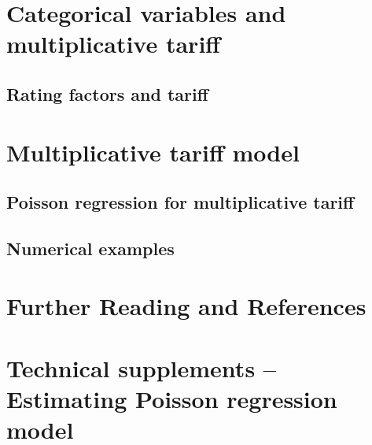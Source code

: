 \documentclass[]{book}
\theoremstyle{definition}
\theoremstyle{definition}
\theoremstyle{definition}
\theoremstyle{remark}
\begin{document}
\section{Categorical variables and multiplicative
tariff}\label{categorical-variables-and-multiplicative-tariff}

\subsection{Rating factors and tariff}\label{rating-factors-and-tariff}

\section{Multiplicative tariff model}\label{multiplicative-tariff-model}

\subsection{Poisson regression for multiplicative
tariff}\label{poisson-regression-for-multiplicative-tariff}

\subsection{Numerical examples}\label{numerical-examples}

\section{Further Reading and
References}\label{further-reading-and-references}

\section{Technical supplements -- Estimating Poisson regression
model}\label{S:mle.Pois.reg}


\end{document}
